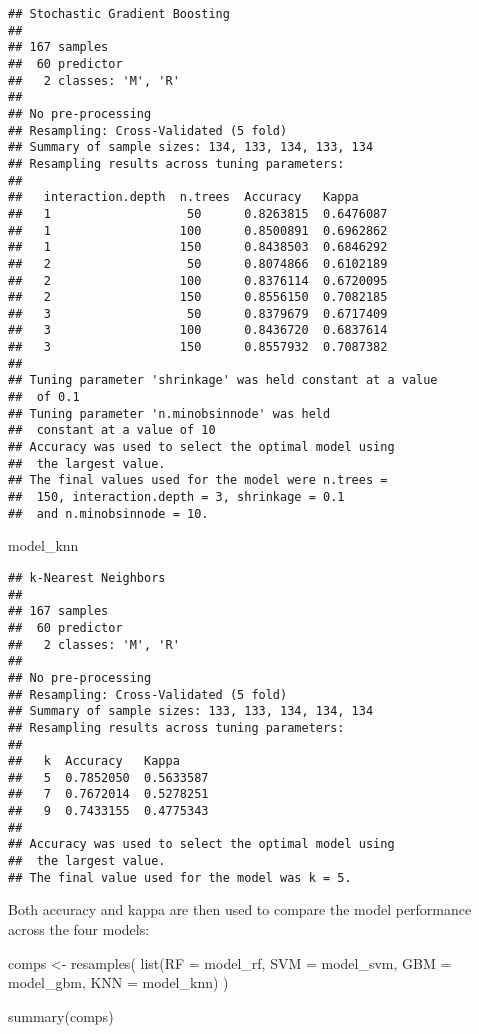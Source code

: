 \documentclass[
]{book}
\newenvironment{Shaded}{\begin{snugshade}}{\end{snugshade}}
\newcommand{\AttributeTok}[1]{\textcolor[rgb]{0.77,0.63,0.00}{#1}}
\newcommand{\FunctionTok}[1]{\textcolor[rgb]{0.00,0.00,0.00}{#1}}
\newcommand{\NormalTok}[1]{#1}
\newcommand{\OtherTok}[1]{\textcolor[rgb]{0.56,0.35,0.01}{#1}}
\begin{document}
\begin{verbatim}
## Stochastic Gradient Boosting 
## 
## 167 samples
##  60 predictor
##   2 classes: 'M', 'R' 
## 
## No pre-processing
## Resampling: Cross-Validated (5 fold) 
## Summary of sample sizes: 134, 133, 134, 133, 134 
## Resampling results across tuning parameters:
## 
##   interaction.depth  n.trees  Accuracy   Kappa    
##   1                   50      0.8263815  0.6476087
##   1                  100      0.8500891  0.6962862
##   1                  150      0.8438503  0.6846292
##   2                   50      0.8074866  0.6102189
##   2                  100      0.8376114  0.6720095
##   2                  150      0.8556150  0.7082185
##   3                   50      0.8379679  0.6717409
##   3                  100      0.8436720  0.6837614
##   3                  150      0.8557932  0.7087382
## 
## Tuning parameter 'shrinkage' was held constant at a value
##  of 0.1
## Tuning parameter 'n.minobsinnode' was held
##  constant at a value of 10
## Accuracy was used to select the optimal model using
##  the largest value.
## The final values used for the model were n.trees =
##  150, interaction.depth = 3, shrinkage = 0.1
##  and n.minobsinnode = 10.
\end{verbatim}

\begin{Shaded}
\begin{Highlighting}[]
\NormalTok{model\_knn}
\end{Highlighting}
\end{Shaded}

\begin{verbatim}
## k-Nearest Neighbors 
## 
## 167 samples
##  60 predictor
##   2 classes: 'M', 'R' 
## 
## No pre-processing
## Resampling: Cross-Validated (5 fold) 
## Summary of sample sizes: 133, 133, 134, 134, 134 
## Resampling results across tuning parameters:
## 
##   k  Accuracy   Kappa    
##   5  0.7852050  0.5633587
##   7  0.7672014  0.5278251
##   9  0.7433155  0.4775343
## 
## Accuracy was used to select the optimal model using
##  the largest value.
## The final value used for the model was k = 5.
\end{verbatim}

Both accuracy and kappa are then used to compare the model performance across the four models:

\begin{Shaded}
\begin{Highlighting}[]
\NormalTok{comps }\OtherTok{\textless{}{-}} \FunctionTok{resamples}\NormalTok{(}
  \FunctionTok{list}\NormalTok{(}\AttributeTok{RF =}\NormalTok{ model\_rf, }\AttributeTok{SVM =}\NormalTok{ model\_svm, }\AttributeTok{GBM =}\NormalTok{ model\_gbm, }
       \AttributeTok{KNN =}\NormalTok{ model\_knn)}
\NormalTok{  )}

\FunctionTok{summary}\NormalTok{(comps)}
\end{Highlighting}
\end{Shaded}
\end{document}
